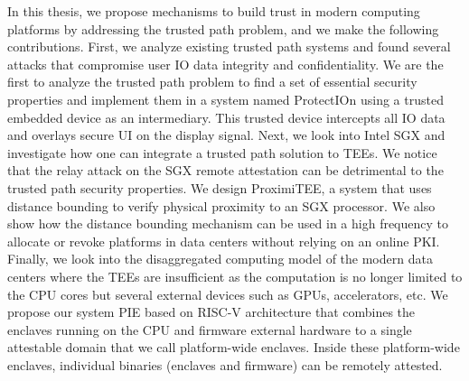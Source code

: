 In this thesis, we propose mechanisms to build trust in modern computing platforms by addressing the trusted path problem, and we make the following contributions. First, we analyze existing trusted path systems and found several attacks that compromise user IO data integrity and confidentiality. We are the first to analyze the trusted path problem to find a set of essential security properties and implement them in a system named ProtectIOn using a trusted embedded device as an intermediary. This trusted device intercepts all IO data and overlays secure UI on the display signal. Next, we look into Intel SGX and investigate how one can integrate a trusted path solution to TEEs. We notice that the relay attack on the SGX remote attestation can be detrimental to the trusted path security properties. We design ProximiTEE, a system that uses distance bounding to verify physical proximity to an SGX processor. We also show how the distance bounding mechanism can be used in a high frequency to allocate or revoke platforms in data centers without relying on an online PKI. Finally, we look into the disaggregated computing model of the modern data centers where the TEEs are insufficient as the computation is no longer limited to the CPU cores but several external devices such as GPUs, accelerators, etc. We propose our system PIE based on RISC-V architecture that combines the enclaves running on the CPU and firmware external hardware to a single attestable domain that we call platform-wide enclaves. Inside these platform-wide enclaves, individual binaries (enclaves and firmware) can be remotely attested.
  

\endgroup
